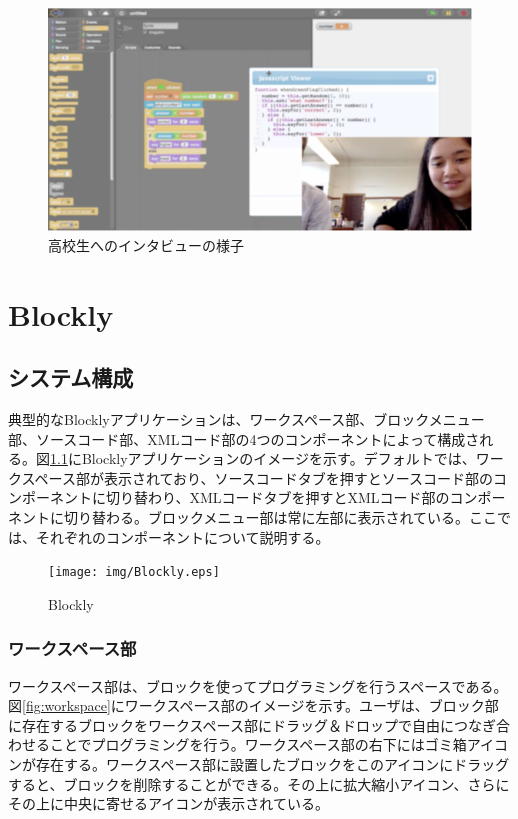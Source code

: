\documentclass{risepaper}
\begin{document}
\begin{figure}[h]
\begin{center}
\includegraphics[scale=0.8]{img/idc.png}
\caption{高校生へのインタビューの様子}%
\label{fig:idc}
\end{center}%
\end{figure}%

   \chapter{Blockly}
  
  
   \section{システム構成}
   
典型的なBlocklyアプリケーションは、ワークスペース部、ブロックメニュー部、ソースコード部、XMLコード部の4つのコンポーネントによって構成される。図\ref{fig:Blockly}にBlocklyアプリケーションのイメージを示す。デフォルトでは、ワークスペース部が表示されており、ソースコードタブを押すとソースコード部のコンポーネントに切り替わり、XMLコードタブを押すとXMLコード部のコンポーネントに切り替わる。ブロックメニュー部は常に左部に表示されている。ここでは、それぞれのコンポーネントについて説明する。
  

\begin{figure}[h]
\begin{center}
\texttt{[image: img/Blockly.eps]}
\caption{Blockly}%
\label{fig:Blockly}
\end{center}%
\end{figure}%

   \subsection{ワークスペース部}

ワークスペース部は、ブロックを使ってプログラミングを行うスペースである。図\ref{fig:workspace}にワークスペース部のイメージを示す。ユーザは、ブロック部に存在するブロックをワークスペース部にドラッグ＆ドロップで自由につなぎ合わせることでプログラミングを行う。ワークスペース部の右下にはゴミ箱アイコンが存在する。ワークスペース部に設置したブロックをこのアイコンにドラッグすると、ブロックを削除することができる。その上に拡大縮小アイコン、さらにその上に中央に寄せるアイコンが表示されている。
\end{document}

